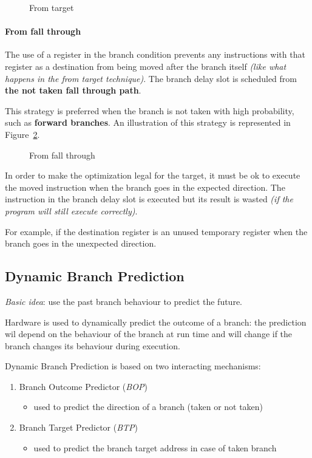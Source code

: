 \documentclass[english]{article}
\begin{document}
\begin{figure}[htbp]
  \bigskip
  \centering
  \caption{From target}
  \label{fig:from-target}
  \bigskip
\end{figure}

\paragraph{From fall through}

The use of a register in the branch condition prevents any instructions with that register as a destination from being moved after the branch itself \textit{(like what happens in the from target technique)}.
The branch delay slot is scheduled from \textbf{the not taken fall through path}.

This strategy is preferred when the branch is not taken with high probability, such as \textbf{forward branches}.
An illustration of this strategy is represented in Figure~\ref{fig:from-fall-through}.

\begin{figure}[htbp]
  \bigskip
  \centering
  \caption{From fall through}
  \label{fig:from-fall-through}
  \bigskip
\end{figure}

In order to make the optimization legal for the target, it must be ok to execute the moved instruction when the branch goes in the expected direction.
The instruction in the branch delay slot is executed but its result is wasted \textit{(if the program will still execute correctly)}.

For example, if the destination register is an unused temporary register when the branch goes in the unexpected direction.

\subsection{Dynamic Branch Prediction}

\textit{Basic idea}: use the past branch behaviour to predict the future.

Hardware is used to dynamically predict the outcome of a branch: the prediction wil depend on the behaviour of the branch at run time and will change if the branch changes its behaviour during execution.

\bigskip
Dynamic Branch Prediction is based on two interacting mechanisms:

\begin{enumerate}
  \item Branch Outcome Predictor (\textit{BOP})
        \begin{itemize}
          \item used to predict the direction of a branch (taken or not taken)
        \end{itemize}
  \item Branch Target Predictor (\textit{BTP})
        \begin{itemize}
          \item used to predict the branch target address in case of taken branch
        \end{itemize}
\end{enumerate}
\end{document}
